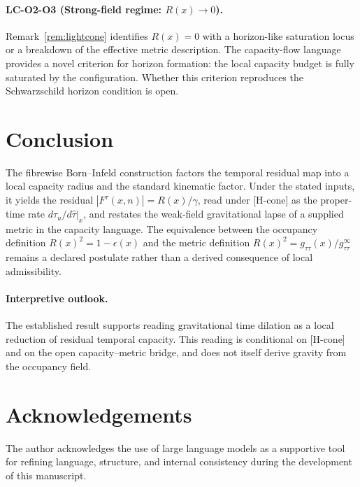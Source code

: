 \documentclass[11pt,a4paper]{article}
\begin{document}
    \paragraph{LC-O2-O3 (Strong-field regime: $R(x) \to 0$).}
      Remark~\ref{rem:lightcone} identifies $R(x) = 0$ with a horizon-like saturation locus
      or a breakdown of the effective metric description.
      The capacity-flow language provides a novel criterion for horizon formation:
      the local capacity budget is fully saturated by the configuration.
      Whether this criterion reproduces the Schwarzschild horizon condition is open.

  \section{Conclusion}
  \label{sec:conclusion}

    The fibrewise Born--Infeld construction factors the temporal residual map into a local
    capacity radius and the standard kinematic factor.
    Under the stated inputs, it yields the residual $|F^\tau(x,n)|=R(x)/\gamma$, read under [H-cone] as the
    proper-time rate $d\tau_u/d\hat\tau|_x$, and restates the weak-field
    gravitational lapse of a supplied metric in the capacity language.
    The equivalence between the occupancy definition $R(x)^2=1-\epsilon(x)$ and the metric
    definition $R(x)^2=g_{\tau\tau}(x)/g_{\tau\tau}^\infty$ remains a declared postulate rather than a derived
    consequence of local admissibility.

    \paragraph{Interpretive outlook.}
    The established result supports reading gravitational time dilation as a local reduction of
    residual temporal capacity.
    This reading is conditional on [H-cone] and on the open capacity--metric bridge, and does not itself derive
    gravity from the occupancy field.

  \section*{Acknowledgements}

  The author acknowledges the use of large language models as a supportive tool for refining
  language, structure, and internal consistency during the development of this manuscript.

  \newpage

  
  
\end{document}
